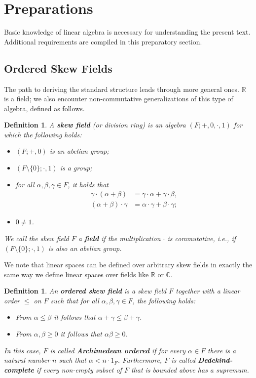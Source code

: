 \documentclass[11pt,a4paper]{article}
\newtheorem{definition}[theorem]{Definition}
\begin{document}
\section{Preparations}

Basic knowledge of linear algebra is necessary for understanding the present text. Additional requirements are compiled in this preparatory section.

\subsection{Ordered Skew Fields}

The path to deriving the standard structure leads through more general ones. $\mathbb{R}$ is a field; we also encounter non-commutative generalizations of this type of algebra, defined as follows.

\begin{definition} \label{def:skew_field}
A \textbf{skew field} (or division ring) is an algebra $(F; +, 0, \cdot, 1)$ for which the following holds:
\begin{itemize}
    \item[(SK1)] $(F; +, 0)$ is an abelian group;
    \item[(SK2)] $(F \setminus \{0\}; \cdot, 1)$ is a group;
    \item[(SK3)] for all $\alpha, \beta, \gamma \in F$, it holds that
    \begin{align*}
        \gamma \cdot (\alpha + \beta) &= \gamma \cdot \alpha + \gamma \cdot \beta, \\
        (\alpha + \beta) \cdot \gamma &= \alpha \cdot \gamma + \beta \cdot \gamma;
    \end{align*}
    \item[(SK4)] $0 \neq 1$.
\end{itemize}
We call the skew field $F$ a \textbf{field} if the multiplication $\cdot$ is commutative, i.e., if $(F \setminus \{0\}; \cdot, 1)$ is also an abelian group.
\end{definition}

We note that linear spaces can be defined over arbitrary skew fields in exactly the same way we define linear spaces over fields like $\mathbb{R}$ or $\mathbb{C}$.

\begin{definition} \label{def:ordered_skew_field}
An \textbf{ordered skew field} is a skew field $F$ together with a linear order $\le$ on $F$ such that for all $\alpha, \beta, \gamma \in F$, the following holds:
\begin{itemize}
    \item[(GSK1)] From $\alpha \le \beta$ it follows that $\alpha + \gamma \le \beta + \gamma$.
    \item[(GSK2)] From $\alpha, \beta \ge 0$ it follows that $\alpha \beta \ge 0$.
\end{itemize}
In this case, $F$ is called \textbf{Archimedean ordered} if for every $\alpha \in F$ there is a natural number $n$ such that $\alpha < n \cdot 1_F$. Furthermore, $F$ is called \textbf{Dedekind-complete} if every non-empty subset of $F$ that is bounded above has a supremum.
\end{definition}
\end{document}
